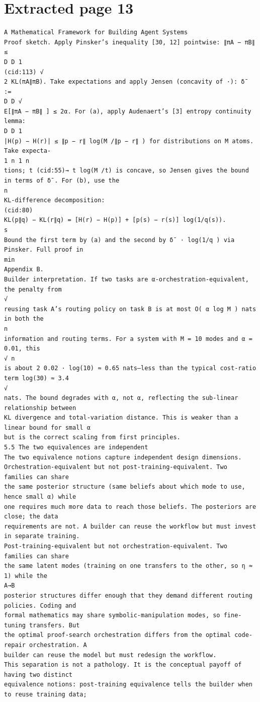 \documentclass[11pt]{article}
\begin{document}
\clearpage
\section*{Extracted page 13}
\begin{verbatim}
A Mathematical Framework for Building Agent Systems
Proof sketch. Apply Pinsker’s inequality [30, 12] pointwise: ∥πA − πB∥ ≤
D D 1
(cid:113) √
2 KL(πA∥πB). Take expectations and apply Jensen (concavity of ·): δ¯ :=
D D √
E[∥πA − πB∥ ] ≤ 2α. For (a), apply Audenaert’s [3] entropy continuity lemma:
D D 1
|H(p) − H(r)| ≤ ∥p − r∥ log(M /∥p − r∥ ) for distributions on M atoms. Take expecta-
1 n 1 n
tions; t (cid:55)→ t log(M /t) is concave, so Jensen gives the bound in terms of δ¯. For (b), use the
n
KL-difference decomposition:
(cid:80)
KL(p∥q) − KL(r∥q) = [H(r) − H(p)] + [p(s) − r(s)] log(1/q(s)).
s
Bound the first term by (a) and the second by δ¯ · log(1/q ) via Pinsker. Full proof in
min
Appendix B.
Builder interpretation. If two tasks are α-orchestration-equivalent, the penalty from
√
reusing task A’s routing policy on task B is at most O( α log M ) nats in both the
n
information and routing terms. For a system with M = 10 modes and α = 0.01, this
√ n
is about 2 0.02 · log(10) ≈ 0.65 nats—less than the typical cost-ratio term log(30) ≈ 3.4
√
nats. The bound degrades with α, not α, reflecting the sub-linear relationship between
KL divergence and total-variation distance. This is weaker than a linear bound for small α
but is the correct scaling from first principles.
5.5 The two equivalences are independent
The two equivalence notions capture independent design dimensions.
Orchestration-equivalent but not post-training-equivalent. Two families can share
the same posterior structure (same beliefs about which mode to use, hence small α) while
one requires much more data to reach those beliefs. The posteriors are close; the data
requirements are not. A builder can reuse the workflow but must invest in separate training.
Post-training-equivalent but not orchestration-equivalent. Two families can share
the same latent modes (training on one transfers to the other, so η ≈ 1) while the
A→B
posterior structures differ enough that they demand different routing policies. Coding and
formal mathematics may share symbolic-manipulation modes, so fine-tuning transfers. But
the optimal proof-search orchestration differs from the optimal code-repair orchestration. A
builder can reuse the model but must redesign the workflow.
This separation is not a pathology. It is the conceptual payoff of having two distinct
equivalence notions: post-training equivalence tells the builder when to reuse training data;

\end{verbatim}
\end{document}
